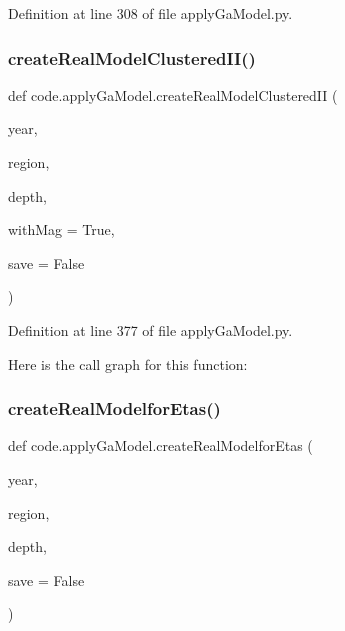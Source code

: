 Definition at line 308 of file apply\+Ga\+Model.\+py.

\mbox{\label{namespacecode_1_1apply_ga_model_a5b912584423540d386d79d90e4382d14}} 
\subsubsection{\texorpdfstring{create\+Real\+Model\+Clustered\+I\+I()}{createRealModelClusteredII()}}
{\footnotesize\ttfamily def code.\+apply\+Ga\+Model.\+create\+Real\+Model\+Clustered\+II (\begin{DoxyParamCaption}\item[{}]{year,  }\item[{}]{region,  }\item[{}]{depth,  }\item[{}]{with\+Mag = {\ttfamily True},  }\item[{}]{save = {\ttfamily False} }\end{DoxyParamCaption})}



Definition at line 377 of file apply\+Ga\+Model.\+py.

Here is the call graph for this function\+:
\mbox{\label{namespacecode_1_1apply_ga_model_a5f392b173052cddbd7db5e85185575b8}} 
\subsubsection{\texorpdfstring{create\+Real\+Modelfor\+Etas()}{createRealModelforEtas()}}
{\footnotesize\ttfamily def code.\+apply\+Ga\+Model.\+create\+Real\+Modelfor\+Etas (\begin{DoxyParamCaption}\item[{}]{year,  }\item[{}]{region,  }\item[{}]{depth,  }\item[{}]{save = {\ttfamily False} }\end{DoxyParamCaption})}



